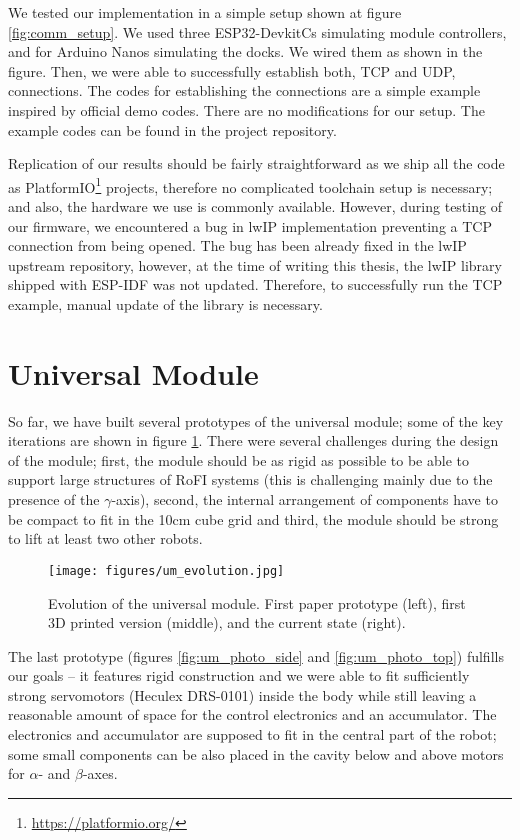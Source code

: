 We tested our implementation in a simple setup shown at figure
\ref{fig:comm_setup}. We used three ESP32-DevkitCs simulating module
controllers, and for Arduino Nanos simulating the docks. We wired them as shown
in the figure. Then, we were able to successfully establish both, TCP and UDP,
connections. The codes for establishing the connections are a simple example
inspired by official demo codes. There are no modifications for our setup. The
example codes can be found in the project repository.

Replication of our results should be fairly straightforward as we ship all the
code as PlatformIO\footnote{\url{https://platformio.org/}} projects, therefore
no complicated toolchain setup is necessary; and also, the hardware we use is
commonly available. However, during testing of our firmware, we encountered a
bug in lwIP implementation preventing a TCP connection from being opened. The
bug has been already fixed in the lwIP upstream repository, however, at the time
of writing this thesis, the lwIP library shipped with ESP-IDF was not updated.
Therefore, to successfully run the TCP example, manual update of the library is
necessary.

\section{Universal Module}

So far, we have built several prototypes of the universal module; some of the
key iterations are shown in figure \ref{fig:um_evolution}. There were several
challenges during the design of the module; first, the module should be as rigid
as possible to be able to support large structures of RoFI systems (this is
challenging mainly due to the presence of the $\gamma$-axis), second, the
internal arrangement of components have to be compact to fit in the 10cm cube
grid and third, the module should be strong to lift at least two other robots.

\begin{figure}[!t]
    \centering
    \texttt{[image: figures/um\_evolution.jpg]}
    \caption{Evolution of the universal module. First paper prototype (left),
    first 3D printed version (middle), and the current state (right).}
    \label{fig:um_evolution}
\end{figure}

The last prototype (figures \ref{fig:um_photo_side} and \ref{fig:um_photo_top})
fulfills our goals -- it features rigid construction and we were able to fit
sufficiently strong servomotors (Heculex DRS-0101) inside the body while still
leaving a reasonable amount of space for the control electronics and an
accumulator. The electronics and accumulator are supposed to fit in the central
part of the robot; some small components can be also placed in the cavity below
and above motors for $\alpha$- and $\beta$-axes.

